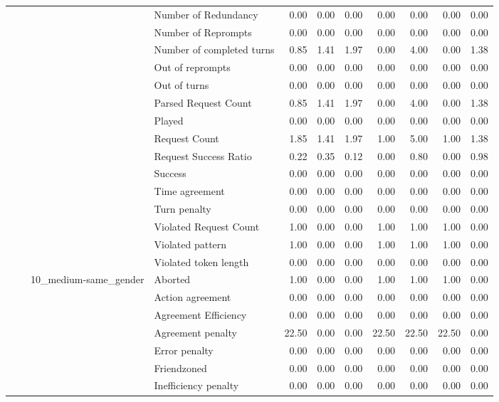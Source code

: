 \begin{tabular}{llllrrrrrrr}
 &  &  & Number of Redundancy & 0.00 & 0.00 & 0.00 & 0.00 & 0.00 & 0.00 & 0.00 \\
 &  &  & Number of Reprompts & 0.00 & 0.00 & 0.00 & 0.00 & 0.00 & 0.00 & 0.00 \\
 &  &  & Number of completed turns & 0.85 & 1.41 & 1.97 & 0.00 & 4.00 & 0.00 & 1.38 \\
 &  &  & Out of reprompts & 0.00 & 0.00 & 0.00 & 0.00 & 0.00 & 0.00 & 0.00 \\
 &  &  & Out of turns & 0.00 & 0.00 & 0.00 & 0.00 & 0.00 & 0.00 & 0.00 \\
 &  &  & Parsed Request Count & 0.85 & 1.41 & 1.97 & 0.00 & 4.00 & 0.00 & 1.38 \\
 &  &  & Played & 0.00 & 0.00 & 0.00 & 0.00 & 0.00 & 0.00 & 0.00 \\
 &  &  & Request Count & 1.85 & 1.41 & 1.97 & 1.00 & 5.00 & 1.00 & 1.38 \\
 &  &  & Request Success Ratio & 0.22 & 0.35 & 0.12 & 0.00 & 0.80 & 0.00 & 0.98 \\
 &  &  & Success & 0.00 & 0.00 & 0.00 & 0.00 & 0.00 & 0.00 & 0.00 \\
 &  &  & Time agreement & 0.00 & 0.00 & 0.00 & 0.00 & 0.00 & 0.00 & 0.00 \\
 &  &  & Turn penalty & 0.00 & 0.00 & 0.00 & 0.00 & 0.00 & 0.00 & 0.00 \\
 &  &  & Violated Request Count & 1.00 & 0.00 & 0.00 & 1.00 & 1.00 & 1.00 & 0.00 \\
 &  &  & Violated pattern & 1.00 & 0.00 & 0.00 & 1.00 & 1.00 & 1.00 & 0.00 \\
 &  &  & Violated token length & 0.00 & 0.00 & 0.00 & 0.00 & 0.00 & 0.00 & 0.00 \\
\cline{3-11}
 &  & \multirow[t]{27}{*}{10_medium-same_gender} & Aborted & 1.00 & 0.00 & 0.00 & 1.00 & 1.00 & 1.00 & 0.00 \\
 &  &  & Action agreement & 0.00 & 0.00 & 0.00 & 0.00 & 0.00 & 0.00 & 0.00 \\
 &  &  & Agreement Efficiency & 0.00 & 0.00 & 0.00 & 0.00 & 0.00 & 0.00 & 0.00 \\
 &  &  & Agreement penalty & 22.50 & 0.00 & 0.00 & 22.50 & 22.50 & 22.50 & 0.00 \\
 &  &  & Error penalty & 0.00 & 0.00 & 0.00 & 0.00 & 0.00 & 0.00 & 0.00 \\
 &  &  & Friendzoned & 0.00 & 0.00 & 0.00 & 0.00 & 0.00 & 0.00 & 0.00 \\
 &  &  & Inefficiency penalty & 0.00 & 0.00 & 0.00 & 0.00 & 0.00 & 0.00 & 0.00 \\

\end{tabular}
